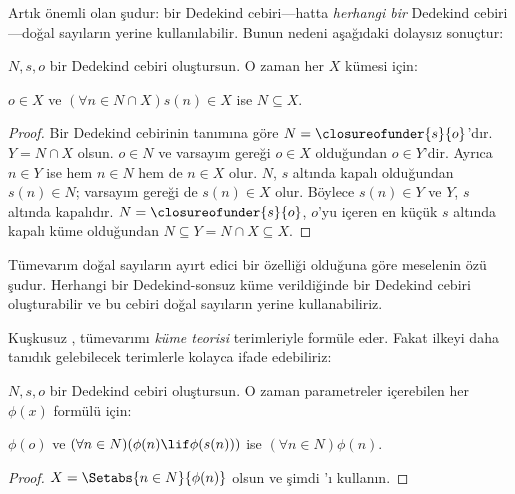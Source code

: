 \documentclass[../../../include/open-logic-section]{subfiles}
\begin{document}

Artık önemli olan şudur: bir Dedekind cebiri---hatta \emph{herhangi bir}
Dedekind cebiri---doğal sayıların yerine kullanılabilir. Bunun nedeni
aşağıdaki dolaysız sonuçtur:

\begin{thm}
$N,s,o$ bir Dedekind cebiri oluştursun. O zaman her $X$ kümesi için:
	\begin{center}
		$o \in X$ ve $(\forall {n} \in N \cap X){s}({n}) \in X$ ise
		$N \subseteq X$.
	\end{center}
\end{thm}

\begin{proof}
Bir Dedekind cebirinin tanımına göre $N=\closureofunder{s}{o}$'dır.
$Y=N\cap X$ olsun. $o\in N$ ve varsayım gereği $o\in X$ olduğundan
$o\in Y$'dir. Ayrıca $n\in Y$ ise hem $n\in N$ hem de $n\in X$ olur.
$N$, $s$ altında kapalı olduğundan $s(n)\in N$; varsayım gereği de
$s(n)\in X$ olur. Böylece $s(n)\in Y$ ve $Y$, $s$ altında kapalıdır.
$N=\closureofunder{s}{o}$, $o$'yu içeren en küçük $s$ altında kapalı küme
olduğundan $N\subseteq Y=N\cap X\subseteq X$.
\end{proof}

Tümevarım doğal sayıların ayırt edici bir özelliği olduğuna göre meselenin
özü şudur. Herhangi bir Dedekind-sonsuz küme verildiğinde bir Dedekind cebiri
oluşturabilir ve bu cebiri doğal sayıların yerine kullanabiliriz.

Kuşkusuz , tümevarımı \emph{küme teorisi}
terimleriyle formüle eder. Fakat ilkeyi daha tanıdık gelebilecek terimlerle
kolayca ifade edebiliriz:

\begin{cor}
$N,s,o$ bir Dedekind cebiri oluştursun. O zaman parametreler içerebilen her
$\phi(x)$ formülü için:
\begin{center}
	$\phi(o)$ ve $(\forall {n} \in N)(\phi(n)\lif
	\phi({s}({n})))$ ise $(\forall n \in N)\phi(n)$.
\end{center}
\end{cor}

\begin{proof}
$X=\Setabs{n\in N}{\phi(n)}$ olsun ve şimdi
'ı kullanın.
\end{proof}
\end{document}

